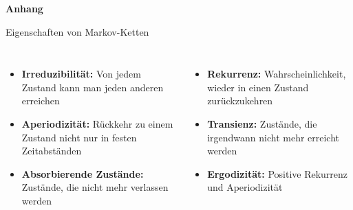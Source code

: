 \appendix
\begin{frame}
    \centering
    \vspace{2cm}
    {\Huge\textbf{Anhang}}
\end{frame}

\begin{frame}{Eigenschaften von Markov-Ketten}
    \begin{columns}
        \begin{itemize}[<+->]
            \item \textbf{Irreduzibilität:} Von jedem Zustand kann man jeden anderen erreichen
            \item \textbf{Aperiodizität:} Rückkehr zu einem Zustand nicht nur in festen Zeitabständen
            \item \textbf{Absorbierende Zustände:} Zustände, die nicht mehr verlassen werden
        \end{itemize}

        \begin{itemize}[<+->]
            \item \textbf{Rekurrenz:} Wahrscheinlichkeit, wieder in einen Zustand zurückzukehren
            \item \textbf{Transienz:} Zustände, die irgendwann nicht mehr erreicht werden
            \item \textbf{Ergodizität:} Positive Rekurrenz und Aperiodizität
        \end{itemize}
    \end{columns}
\end{frame}

